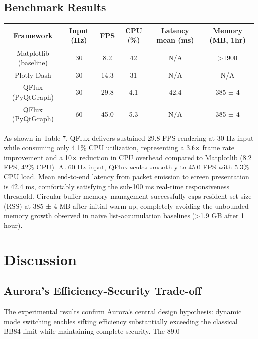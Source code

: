 {{{{{{\subsection{Benchmark Results}
\begin{table}[hbt!]
\centering
\begin{tabular}{|c|c|c|c|c|c|}
\hline
\textbf{Framework} & \textbf{Input (Hz)} & \textbf{FPS} & \textbf{CPU (\%)} & \textbf{Latency mean (ms)} & \textbf{Memory (MB, 1hr)} \\
\hline
Matplotlib (baseline) & 30 & 8.2 & 42 & N/A & >1900 \\
Plotly Dash & 30 & 14.3 & 31 & N/A & N/A \\
QFlux (PyQtGraph) & 30 & 29.8 & 4.1 & 42.4 & 385 ± 4 \\
QFlux (PyQtGraph) & 60 & 45.0 & 5.3 & N/A & 385 ± 4 \\
\hline
\end{tabular}
\end{table}

As shown in Table 7, QFlux delivers sustained 29.8 FPS rendering at 30 Hz input while consuming only 4.1\% CPU utilization, representing a 3.6× frame rate improvement and a 10× reduction in CPU overhead compared to Matplotlib (8.2 FPS, 42\% CPU). At 60 Hz input, QFlux scales smoothly to 45.0 FPS with 5.3\% CPU load. Mean end-to-end latency from packet emission to screen presentation is 42.4 ms, comfortably satisfying the sub-100 ms real-time responsiveness threshold. Circular buffer memory management successfully caps resident set size (RSS) at 385 ± 4 MB after initial warm-up, completely avoiding the unbounded memory growth observed in naive list-accumulation baselines (>1.9 GB after 1 hour).

\section{Discussion}
\subsection{Aurora's Efficiency-Security Trade-off}
The experimental results confirm Aurora's central design hypothesis: dynamic mode switching enables sifting efficiency substantially exceeding the classical BB84 limit while maintaining complete security. The 89.0%

}}}}}}
